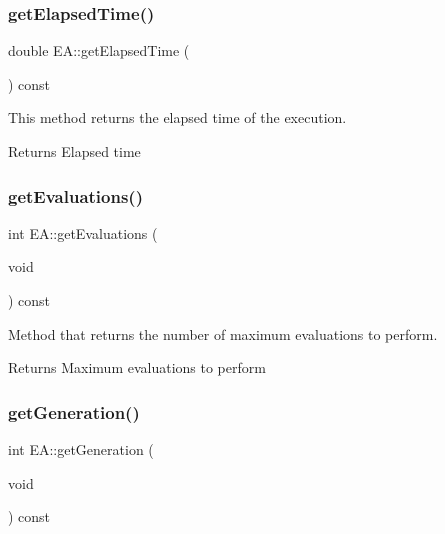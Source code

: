 \subsubsection{\texorpdfstring{get\+Elapsed\+Time()}{getElapsedTime()}}
{\footnotesize\ttfamily double E\+A\+::get\+Elapsed\+Time (\begin{DoxyParamCaption}{ }\end{DoxyParamCaption}) const}



This method returns the elapsed time of the execution. 

\begin{DoxyReturn}{Returns}
Elapsed time 
\end{DoxyReturn}
\mbox{\label{classEA_ad677d015c33f989e079eb9b204f1dd3c}} 
\subsubsection{\texorpdfstring{get\+Evaluations()}{getEvaluations()}}
{\footnotesize\ttfamily int E\+A\+::get\+Evaluations (\begin{DoxyParamCaption}\item[{void}]{ }\end{DoxyParamCaption}) const\hspace{0.3cm}{\ttfamily [inline]}}



Method that returns the number of maximum evaluations to perform. 

\begin{DoxyReturn}{Returns}
Maximum evaluations to perform 
\end{DoxyReturn}
\mbox{\label{classEA_a6fd5e97e8a83ed5b187311cc77c246f5}} 
\subsubsection{\texorpdfstring{get\+Generation()}{getGeneration()}}
{\footnotesize\ttfamily int E\+A\+::get\+Generation (\begin{DoxyParamCaption}\item[{void}]{ }\end{DoxyParamCaption}) const\hspace{0.3cm}{\ttfamily [inline]}}



